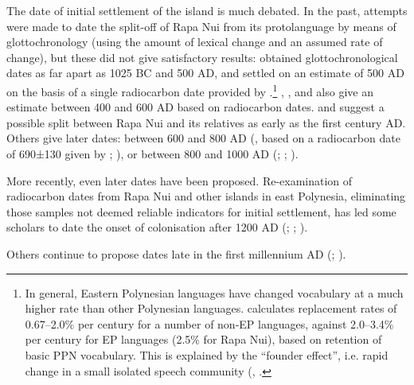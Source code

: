 The date of initial settlement of the island is much debated. In the past, attempts were made to date the split-off of Rapa Nui from its protolanguage by means of glottochronology (using the amount of lexical change and an assumed rate of change), but these did not give satisfactory results: \citet{Emory1963} obtained glottochronological dates as far apart as 1025 BC and 500 AD, and settled on an estimate of 500 AD on the basis of a single radiocarbon date provided by \citet[395]{HeyerdahlFerdon1961}.\footnote{\label{fn:6}In general, Eastern Polynesian languages have changed vocabulary at a much higher rate than other Polynesian languages. \citet{Pawley2009} calculates replacement rates of 0.67–2.0\% per century for a number of non-EP languages, against 2.0–3.4\% per century for EP languages (2.5\% for Rapa Nui), based on retention of basic PPN vocabulary. This is explained by the “founder effect”, i.e. rapid change in a small isolated speech community (\citealt[138]{Marck2000}, \citealt[1818]{WilmshurstHunt2011}.} \citet{Green1967}, \citet[21]{Green1985}, \citet{Emory1972} and \citet{Kirch1986} also give an estimate between 400 and 600 AD based on radiocarbon dates. \citet{DuFeuFischer1993} and \citet{Fischer1992} suggest a possible split between Rapa Nui and its relatives as early as the first century AD. Others give later dates: between 600 and 800 AD (\citealt{Fischer2005}, based on a radiocarbon date of 690±130 given by \citealt{Ayres1971}; \citealt{GreenWeisler2002}), or between 800 and 1000 AD (\citealt[74]{Green2000}; \citealt{SpriggsAnderson1993}; \citealt{Martinsson-WallinCrockford2001}).

More recently, even later dates have been proposed. Re-examination of radiocarbon dates from Rapa Nui and other islands in east Polynesia, eliminating those samples not deemed reliable indicators for initial settlement, has led some scholars to date the onset of colonisation after 1200 AD (\citealt{HuntLipo2006,HuntLipo2007}; \citealt{Hunt2007}; \citealt{WilmshurstHunt2011}).

Others continue to propose dates late in the first millennium AD (\citealt{KirchKahn2007}; \citealt{MiethBork2005,MiethBork2010}).

